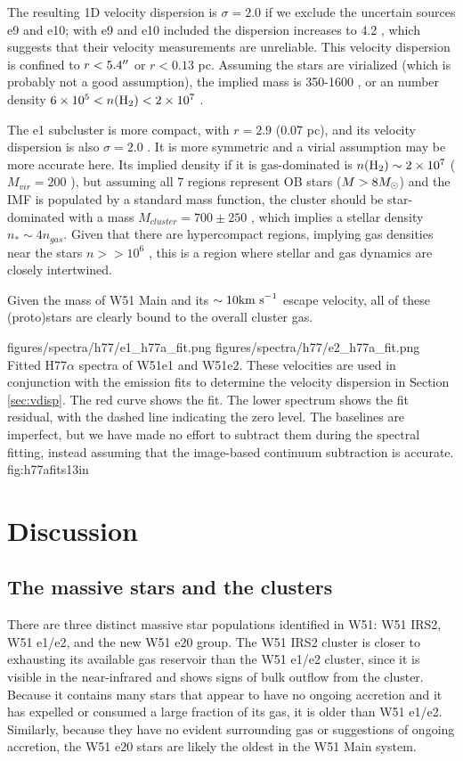 The resulting 1D velocity dispersion is $\sigma=2.0$ \kms if we exclude
the uncertain sources e9
and e10; with e9 and e10 included the dispersion increases to 4.2 \kms, which
suggests that their velocity
measurements  are unreliable.  This velocity dispersion is confined to
$r<5.4\mbox{$^{\prime\prime}$}$ or $r<0.13$ pc.  Assuming the stars are virialized (which is
probably not a good assumption), the implied mass is 350-1600 \msun, or an \hh
number density $6\times10^{5} < n(\textrm{H}_{2}) < 2\times10^{7}$ \percc.

The e1 subcluster is more compact, with $r=2.9$ \arcsec (0.07 pc), and its
velocity dispersion is also $\sigma=2.0$ \kms.  It is more symmetric and a virial
assumption may be more accurate here.  Its implied density if it is gas-dominated
is $n(\textrm{H}_{2})\sim2\times10^{7}$ \percc ($M_{vir}=200$ \msun), but assuming all 7 \hchii
regions represent OB stars ($M>8M_{\odot}$) and the IMF is populated by a standard
\citet{Kroupa2001a} mass function, the cluster should be star-dominated with a
mass $M_{cluster}=700\pm250$ \msun, which implies a stellar density $n_* \sim 4
n_{gas}$.  Given that there are hypercompact \hii regions, implying gas
densities near the stars $n>>10^6$ \percc, this is a region where stellar and
gas dynamics are closely intertwined.

Given the mass of W51 Main and its $\sim10\textrm{km~s}^{-1}$ escape velocity, all of these
(proto)stars are clearly bound to the overall cluster gas. 

\FigureTwo
{figures/spectra/h77/e1_h77a_fit.png}
{figures/spectra/h77/e2_h77a_fit.png}
{Fitted H77$\alpha$ spectra of W51e1 and W51e2.  These velocities are used in
conjunction with the \formaldehyde emission fits to determine the velocity
dispersion in Section \ref{sec:vdisp}.
The red curve shows the fit.  The lower spectrum shows the fit residual, with
the dashed line indicating the zero level.  The baselines are imperfect, but we
have made no effort to subtract them during the spectral fitting, instead
assuming that the image-based continuum subtraction is accurate.
}
{fig:h77afits}{1}{3in}


\section{Discussion}
\label{sec:discussion}

\subsection{The massive stars and the clusters}
\label{sec:mstarscluster}
There are three distinct massive star populations identified in W51: W51 IRS2,
W51 e1/e2, and the new W51 e20 group.  The W51 IRS2 cluster is closer to
exhausting its available gas reservoir than the W51 e1/e2 cluster, since it is
visible in the near-infrared and shows signs of bulk outflow from the cluster.
Because it contains many stars that appear to have no ongoing accretion and it
has expelled or consumed a large fraction of its gas, it is older than W51
e1/e2.  Similarly, because they have no evident surrounding gas or suggestions
of ongoing accretion, the W51 e20 stars are likely the oldest in the W51 Main
system.

